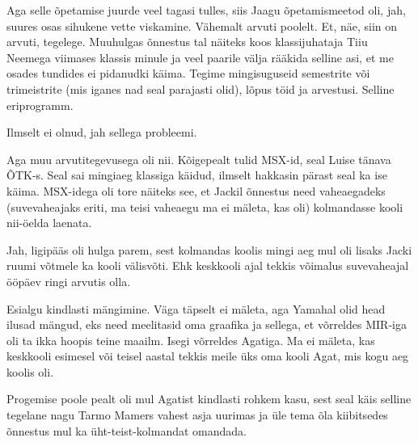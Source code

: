 Aga selle õpetamise juurde veel tagasi tulles, siis Jaagu  õpetamismeetod oli, jah, suures osas sihukene vette viskamine. Vähemalt 
arvuti poolelt. Et, näe, siin on arvuti, tegelege. Muuhulgas õnnestus tal 
näiteks koos klassijuhataja Tiiu Neemega viimases 
klassis  minule ja  veel paarile välja rääkida selline asi, et me osades 
tundides ei pidanudki käima. Tegime mingisuguseid semestrite või trimeistrite 
(mis iganes nad seal parajasti olid), lõpus töid ja arvestusi. Selline 
eriprogramm.


Ilmselt ei olnud, jah sellega probleemi. 

Aga muu arvutitegevusega oli nii. Kõigepealt tulid MSX-id, seal Luise tänava ÕTK-s. 
Seal sai mingiaeg klassiga käidud, ilmselt hakkasin pärast seal ka ise käima. 
MSX-idega oli tore näiteks see, et Jackil õnnestus need 
vaheaegadeks (suvevaheajaks eriti, ma teisi vaheaegu ma ei mäleta, kas oli) 
kolmandasse kooli nii-öelda laenata.
          

Jah, ligipääs oli hulga parem, sest kolmandas koolis mingi aeg mul oli  lisaks Jacki ruumi võtmele ka kooli välisvõti. Ehk 
keskkooli ajal tekkis võimalus suvevaheajal ööpäev ringi arvutis olla.


Esialgu kindlasti mängimine. Väga täpselt ei mäleta, aga 
Yamahal olid head ilusad mängud, eks need meelitasid 
oma graafika ja sellega, et võrreldes MIR-iga oli ta ikka hoopis teine maailm. 
Isegi võrreldes Agatiga. Ma ei mäleta, kas  keskkooli 
esimesel või teisel aastal tekkis meile üks oma kooli Agat, mis kogu aeg koolis oli. 

Progemise poole pealt oli mul Agatist kindlasti rohkem kasu, sest seal käis 
selline tegelane nagu Tarmo Mamers vahest  asja 
uurimas ja üle tema õla kiibitsedes õnnestus mul ka üht-teist-kolmandat 
omandada.

